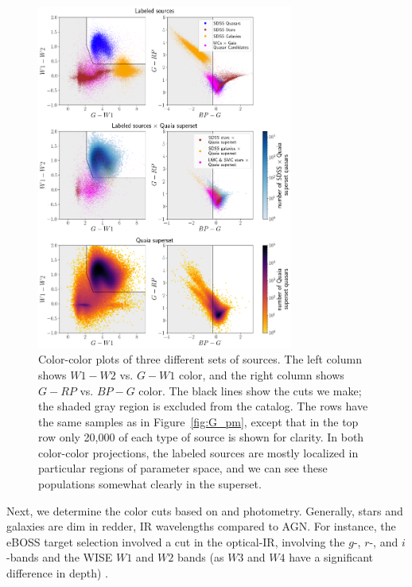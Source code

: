 \begin{figure}[hp]
    \centering
    \includegraphics[width=0.75\textwidth]{color_color.png}

    \caption{Color-color plots of three different sets of sources. The left column shows $W1-W2$ vs. $G-W1$ color, and the right column shows $G-RP$ vs. $BP-G$ color. The black lines show the cuts we make; the shaded gray region is excluded from the catalog. The rows have the same samples as in Figure~\ref{fig:G_pm}, except that in the top row only 20,000 of each type of \SDSS source is shown for clarity. In both color-color projections, the labeled sources are mostly localized in particular regions of parameter space, and we can see these populations somewhat clearly in the \cat superset.} 
    \label{fig:color_color}
\end{figure}

Next, we determine the color cuts based on \Gaia and \unWISE photometry.
Generally, stars and galaxies are dim in redder, IR wavelengths compared to AGN.
For instance, the eBOSS target selection involved a cut in the optical-IR, involving the \SDSS $g$-, $r$-, and $i$-bands and the WISE $W1$ and $W2$ bands (as $W3$ and $W4$ have a significant difference in depth) \citep{myers_target-selection_2023}. 

